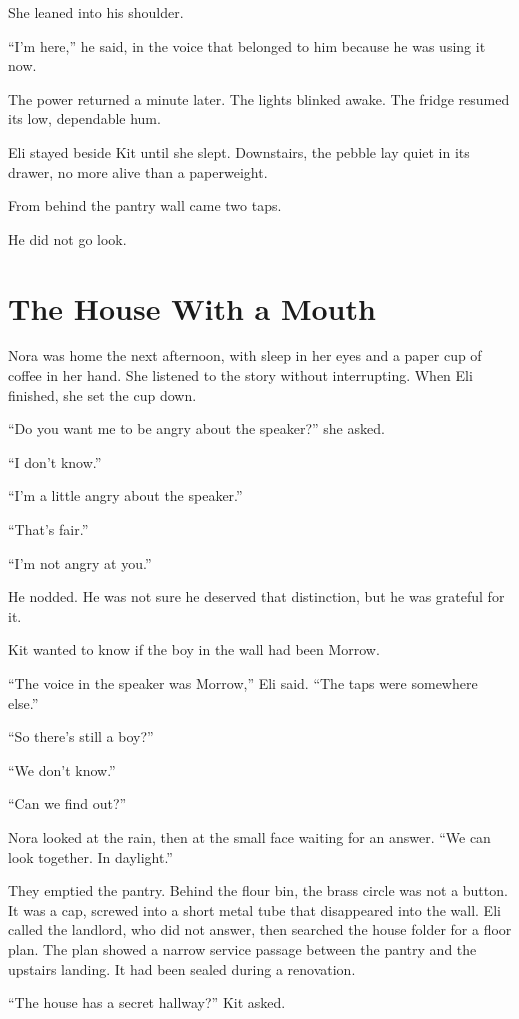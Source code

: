 \documentclass[11pt,openany]{book}
\begin{document}
She leaned into his shoulder.

``I'm here,'' he said, in the voice that belonged to him because he was using it now.

The power returned a minute later. The lights blinked awake. The fridge resumed its low, dependable hum.

Eli stayed beside Kit until she slept. Downstairs, the pebble lay quiet in its drawer, no more alive than a paperweight.

From behind the pantry wall came two taps.

He did not go look.

\chapter{The House With a Mouth}

Nora was home the next afternoon, with sleep in her eyes and a paper cup of coffee in her hand. She listened to the story without interrupting. When Eli finished, she set the cup down.

``Do you want me to be angry about the speaker?'' she asked.

``I don't know.''

``I'm a little angry about the speaker.''

``That's fair.''

``I'm not angry at you.''

He nodded. He was not sure he deserved that distinction, but he was grateful for it.

Kit wanted to know if the boy in the wall had been Morrow.

``The voice in the speaker was Morrow,'' Eli said. ``The taps were somewhere else.''

``So there's still a boy?''

``We don't know.''

``Can we find out?''

Nora looked at the rain, then at the small face waiting for an answer. ``We can look together. In daylight.''

They emptied the pantry. Behind the flour bin, the brass circle was not a button. It was a cap, screwed into a short metal tube that disappeared into the wall. Eli called the landlord, who did not answer, then searched the house folder for a floor plan. The plan showed a narrow service passage between the pantry and the upstairs landing. It had been sealed during a renovation.

``The house has a secret hallway?'' Kit asked.
\end{document}
